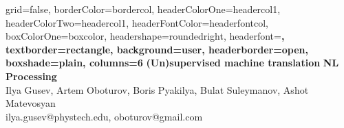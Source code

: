 \documentclass[archE1,portrait]{baposter}
\begin{document}
\background{ %

}

\begin{poster}{
grid=false,
borderColor=bordercol, %
headerColorOne=headercol1, %
headerColorTwo=headercol1, %
headerFontColor=headerfontcol, %
boxColorOne=boxcolor, %
headershape=roundedright, %
headerfont=\Large\sf\bf, %
textborder=rectangle,
background=user,
headerborder=open, %
boxshade=plain,
columns=6
}
{}
%
%
{
\sf\bf (Un)supervised machine translation} %
{\vspace{1em} \textbf{NL Processing}\\
Ilya Gusev, Artem Oboturov, Boris Pyakilya, Bulat Suleymanov, Ashot Matevosyan
\\ %
{\smaller ilya.gusev@phystech.edu, oboturov@gmail.com}\\
} %
%


\end{poster}
\end{document}
